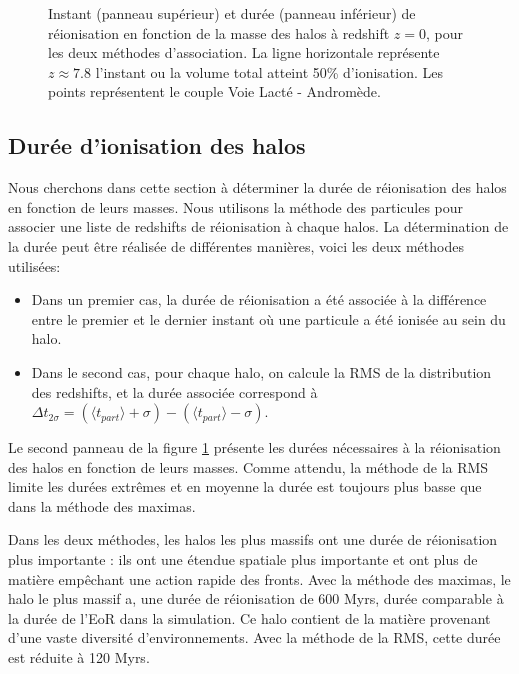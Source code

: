 \begin{figure}
        \caption[Instant et durée de réionisation]{Instant (panneau supérieur) et durée (panneau inférieur) de réionisation en fonction de la masse des halos à redshift $z=0$, pour les deux méthodes d'association. 
        La ligne horizontale représente $z\approx7.8$ l'instant ou la volume total atteint 50\% d'ionisation.
        Les points représentent le couple Voie Lacté - Andromède.
		\label{fig:CODA_t}}
\end{figure}


\subsection{Durée d'ionisation des halos}

Nous cherchons dans cette section à déterminer la durée de réionisation des halos en fonction de leurs masses.
Nous utilisons la méthode des particules pour associer une liste de redshifts de réionisation à chaque halos.
La détermination de la durée peut être réalisée de différentes manières, voici les deux méthodes utilisées:
\begin{itemize}
\item Dans un premier cas, la durée de réionisation a été associée à la différence entre le premier et le dernier instant où une particule a été ionisée au sein du halo.
\item Dans le second cas, pour chaque halo, on calcule la RMS de la distribution des redshifts, et la durée associée correspond à $\Delta t_{2\sigma} =  ( \langle t_{part} \rangle + \sigma) - ( \langle t_{part} \rangle - \sigma)$.
\end{itemize}

Le second panneau de la figure \ref{fig:CODA_t} présente les durées nécessaires à la réionisation des halos en fonction de leurs masses.
Comme attendu, la méthode de la RMS limite les durées extrêmes et en moyenne la durée est toujours plus basse que dans la méthode des maximas.

Dans les deux méthodes, les halos les plus massifs ont une durée de réionisation plus importante : ils ont une étendue spatiale plus importante et ont plus de matière empêchant une action rapide des fronts.
Avec la méthode des maximas, le halo le plus massif a, une durée de réionisation de 600 Myrs, durée comparable à la durée de l'\ac{EoR} dans la simulation.
Ce halo contient de la matière provenant d'une vaste diversité d’environnements. %
Avec la méthode de la RMS, cette durée est réduite à 120 Myrs.

